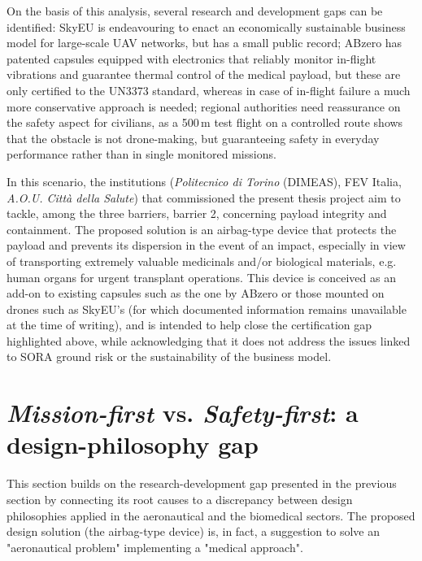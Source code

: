 On the basis of this analysis, several research and development gaps can be identified: SkyEU is endeavouring to enact an economically sustainable business model for large-scale UAV networks, but has a small public record; ABzero has patented capsules equipped with electronics that reliably monitor in-flight vibrations and guarantee thermal control of the medical payload, but these are only certified to the UN3373 standard, whereas in case of in-flight failure a much more conservative approach is needed; regional authorities need reassurance on the safety aspect for civilians, as a 500\,m test flight on a controlled route shows that the obstacle is not drone-making, but guaranteeing safety in everyday performance rather than in single monitored missions.

In this scenario, the institutions (\textit{Politecnico di Torino} (DIMEAS), FEV Italia, \textit{A.O.U. Città della Salute}) that commissioned the present thesis project aim to tackle, among the three barriers, barrier 2, concerning payload integrity and containment. The proposed solution is an airbag-type device that protects the payload and prevents its dispersion in the event of an impact, especially in view of transporting extremely valuable medicinals and/or biological materials, e.g. human organs for urgent transplant operations. This device is conceived as an add-on to existing capsules such as the one by ABzero or those mounted on drones such as SkyEU's (for which documented information remains unavailable at the time of writing), and is intended to help close the certification gap highlighted above, while acknowledging that it does not address the issues linked to SORA ground risk or the sustainability of the business model.



\section{\textit{Mission-first} vs. \textit{Safety-first}: a design-philosophy gap}\label{section:payload-first-approach}
This section builds on the research-development gap presented in the previous section by connecting its root causes to a discrepancy between design philosophies applied in the aeronautical and the biomedical sectors. The proposed design solution (the airbag-type device) is, in fact, a suggestion to solve an "aeronautical problem" implementing a "medical approach".

